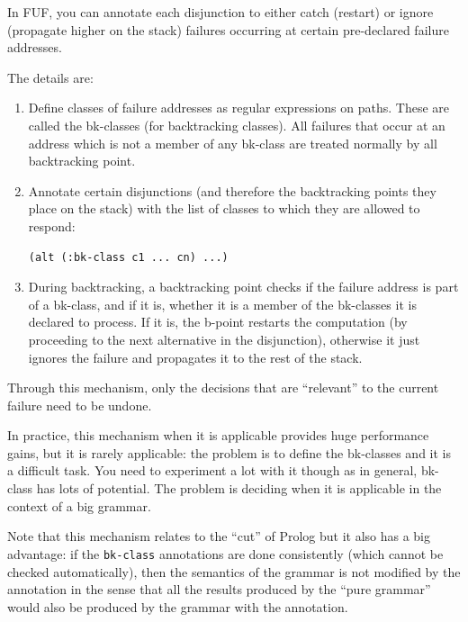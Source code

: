 \documentclass[10pt,a4paper]{report}
\begin{document}
\begin{appendices}
In FUF, you can annotate each disjunction to either catch (restart) or
ignore (propagate higher on the stack) failures occurring at certain
pre-declared failure addresses.  

The details are: 

\begin{enumerate}
\item Define classes of failure addresses as regular expressions on paths.  These
are called the bk-classes (for backtracking classes).  All failures that
occur at an address which is not a member of any bk-class are treated
normally by all backtracking point.

\item Annotate certain disjunctions (and therefore the backtracking points they
place on the stack) with the list of classes to which they are allowed to
respond:
\begin{lstlisting}[language=Lisp]
	(alt (:bk-class c1 ... cn) ...)
\end{lstlisting}

\item During backtracking, a backtracking point checks if the failure address is
part of a bk-class, and if it is, whether it is a member of the bk-classes
it is declared to process.  If it is, the b-point restarts the computation
(by proceeding to the next alternative in the disjunction), otherwise it
just ignores the failure and propagates it to the rest of the stack.

\end{enumerate}

Through this mechanism, only the decisions that are ``relevant'' to the
current failure need to be undone.  

In practice, this mechanism when it is applicable provides huge performance
gains, but it is rarely applicable: the problem is to define the bk-classes
and it is a difficult task.  You need to experiment a lot with it though as
in general, bk-class has lots of potential.  The problem is deciding when
it is applicable in the context of a big grammar.  

Note that this mechanism relates to the ``cut'' of Prolog but it also has a
big advantage: if the {\tt bk-class} annotations are done consistently (which
cannot be checked automatically), then the semantics of the grammar is not
modified by the annotation in the sense that all the results produced by
the ``pure grammar'' would also be produced by the grammar with the
annotation.


\end{appendices}
\end{document}
